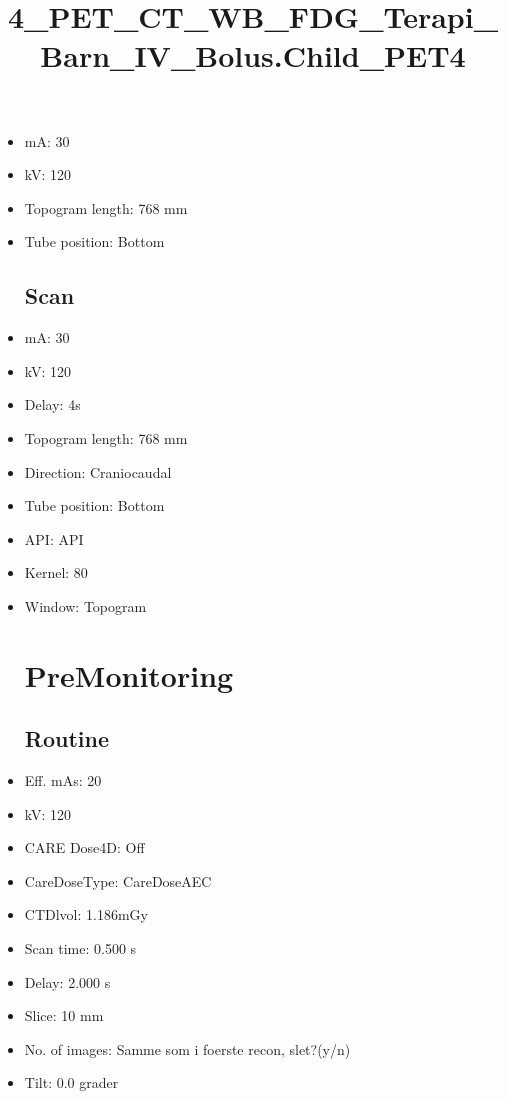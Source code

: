 \documentclass[12pt]{article}
\title{4\_PET\_CT\_WB\_FDG\_Terapi\_Barn\_IV\_Bolus.Child\_PET4}
\begin{document}
\maketitle
\newpage
\tableofcontents
\newpage
{}


\begin{itemize}\section{Topogram}
\subsection{Routine}
\item mA: 30\item kV: 120\item Topogram length: 768 mm\item Tube position: Bottom
\subsection{Scan}\item mA: 30\item kV: 120\item Delay: 4s\item Topogram length: 768 mm\item Direction: Craniocaudal\item Tube position: Bottom\item API: API \item Kernel: 80\item Window: Topogram
\section{PreMonitoring}
\subsection{Routine}
\item Eff. mAs: 20\item kV: 120\item CARE Dose4D: Off\item CareDoseType: CareDoseAEC\item CTDlvol: 1.186mGy\item Scan time: 0.500 s\item Delay: 2.000 s\item Slice: 10 mm\item No. of images: Samme som i foerste recon, slet?(y/n)\item Tilt: 0.0 grader

\end{itemize}
\end{document}
